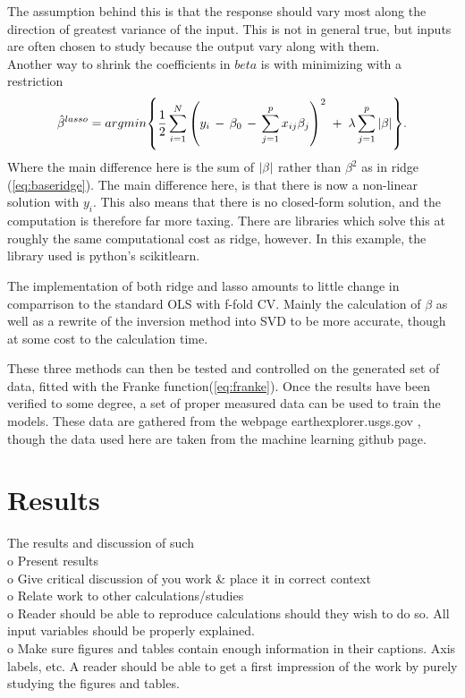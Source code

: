 \documentclass[ 12pt, a4paper ]{article}
\begin{document}
The assumption behind this is that the response should vary most along the direction of greatest
variance of the input. This is not in general true, but inputs are often chosen to study because 
the output vary along with them.\\

Another way to shrink the coefficients in $beta$ is with minimizing with a restriction 
\begin{align}
    \hat{\beta}^{lasso} = argmin\qty{ 
        \frac{1}{2}\sum_{i=1}^N \qty(y_i \,-\, \beta_0 \,-\, \sum_{j=1}^p x_{ij}\beta_j)^2
        \;+\; \lambda\sum_{j=1}^p \abs{\beta}  }.\label{eq:baselasso}
\end{align}
Where the main difference here is the sum of $\abs{\beta}$ rather than $\beta^2$ as in ridge
(\ref{eq:baseridge}). The main difference here, is that there is now a non-linear solution with
$y_i$. This also means that there is no closed-form solution, and the computation is therefore 
far more taxing. There are libraries which solve this at roughly the same computational cost as 
ridge, however. In this example, the library used is python's scikitlearn.
\cite{}%

The implementation of both ridge and lasso amounts to little change in comparrison to the 
standard OLS with f-fold CV. Mainly the calculation of $\beta$ as well as a rewrite of the 
inversion method into SVD to be more accurate, though at some cost to the calculation time. 

These three methods can then be tested and controlled on the generated set of data, fitted with
the Franke function(\ref{eq:franke}). Once the results have been verified to some degree, a set
of proper measured data can be used to train the models. These data are gathered from the 
webpage earthexplorer.usgs.gov
\cite{} %
, though the data used here are taken from the machine learning
github page. 



\section{Results}
    The results and discussion of such\\
    o   Present results \\
    o   Give critical discussion of you work \& place it in correct context\\
    o   Relate work to other calculations/studies\\
    o   Reader should be able to reproduce calculations should they wish to do so. 
        All input variables should be properly explained. \\
    o   Make sure figures and tables contain enough information in their captions. 
        Axis labels, etc. A reader should be able to get a first impression of the work
        by purely studying the figures and tables. \\
\end{document}
